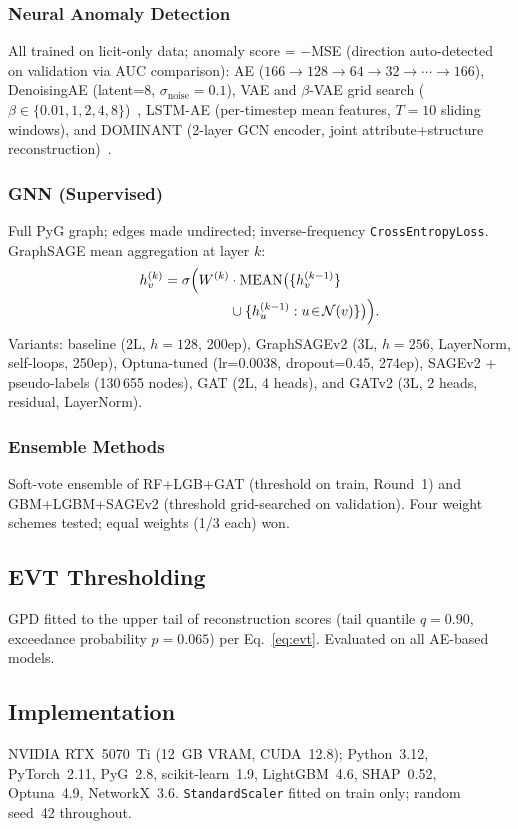 \documentclass[conference]{IEEEtran}
\begin{document}
\subsubsection{Neural Anomaly Detection}
All trained on licit-only data; anomaly score = $-$MSE (direction
auto-detected on validation via AUC comparison):
AE ($166{\to}128{\to}64{\to}32{\to}\cdots{\to}166$), DenoisingAE
(latent=8, $\sigma_\text{noise}{=}0.1$), VAE and $\beta$-VAE grid search
($\beta\!\in\!\{0.01,1,2,4,8\}$)~\cite{higgins2017beta,kingma2014},
LSTM-AE (per-timestep mean features, $T{=}10$ sliding windows), and
DOMINANT (2-layer GCN encoder, joint attribute+structure
reconstruction)~\cite{ding2019dominant}.

\subsubsection{GNN (Supervised)}
Full PyG graph; edges made undirected; inverse-frequency
\texttt{CrossEntropyLoss}.  GraphSAGE mean aggregation at layer $k$:
\begin{equation}
\begin{split}
h_v^{(k)} = \sigma\Bigl(W^{(k)}&\cdot\operatorname{MEAN}\bigl(\{h_v^{(k-1)}\}\\
&\cup\{h_u^{(k-1)}: u\!\in\!\mathcal{N}(v)\}\bigr)\Bigr).
\end{split}
\label{eq:sage}
\end{equation}
Variants: baseline (2L, $h{=}128$, 200ep), GraphSAGEv2 (3L, $h{=}256$,
LayerNorm, self-loops, 250ep), Optuna-tuned (lr=0.0038, dropout=0.45,
274ep), SAGEv2 + pseudo-labels (130\,655 nodes), GAT (2L, 4 heads), and
GATv2 (3L, 2 heads, residual, LayerNorm).

\subsubsection{Ensemble Methods}
Soft-vote ensemble of RF+LGB+GAT (threshold on train, Round~1) and
GBM+LGBM+SAGEv2 (threshold grid-searched on validation).  Four weight
schemes tested; equal weights (1/3 each) won.

\subsection{EVT Thresholding}
GPD fitted to the upper tail of reconstruction scores
(tail quantile $q{=}0.90$, exceedance probability $p{=}0.065$) per
Eq.~\ref{eq:evt}.  Evaluated on all AE-based models.

\subsection{Implementation}
NVIDIA RTX~5070~Ti (12~GB VRAM, CUDA~12.8); Python~3.12, PyTorch~2.11,
PyG~2.8, scikit-learn~1.9, LightGBM~4.6, SHAP~0.52, Optuna~4.9,
NetworkX~3.6.  \texttt{StandardScaler} fitted on train only; random
seed~42 throughout.
\end{document}
